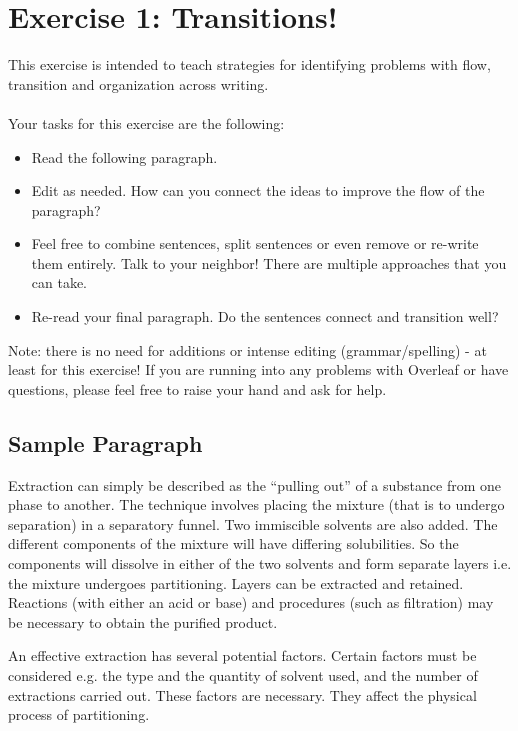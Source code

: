 \documentclass{article}
\begin{document}
\section{Exercise 1: Transitions!}

This exercise is intended to teach strategies for identifying problems with flow, transition and organization across writing.

\paragraph{} Your tasks for this exercise are the following:
\begin{itemize}
\item Read the following paragraph.
\item Edit as needed. How can you connect the ideas to improve the flow of the paragraph?
\item Feel free to combine sentences, split sentences or even remove or re-write them entirely. Talk to your neighbor! There are multiple approaches that you can take.
\item Re-read your final paragraph. Do the sentences connect and transition well?
\end{itemize}

Note: there is no need for additions or intense editing (grammar/spelling) - at least for this exercise! If you are running into any problems with Overleaf or have questions, please feel free to raise your hand and ask for help.

\subsection*{Sample Paragraph}

Extraction can simply be described as the “pulling out” of a substance from one phase to another. The technique involves placing the mixture (that is to undergo separation) in a separatory funnel. Two immiscible solvents are also added. The different components of the mixture will have differing solubilities. So the components will dissolve in either of the two solvents and form separate layers i.e. the mixture undergoes partitioning. Layers can be extracted and retained. Reactions (with either an acid or base) and procedures (such as filtration) may be necessary to obtain the purified product. 

An effective extraction has several potential factors. Certain factors must be considered e.g. the type and the quantity of solvent used, and the number of extractions carried out. These factors are necessary. They affect the physical process of partitioning. 
\end{document}
